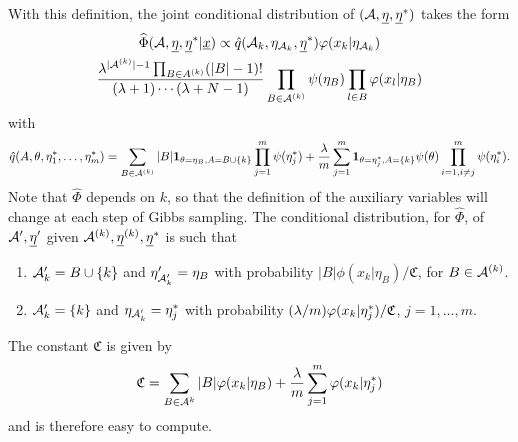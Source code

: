 \begin{enumerate}[label=(\arabic*), wide=0.5cm]
With this definition, the joint conditional distribution of $({\mathcal A}, {\underline{\eta}}, {\underline{\eta}}^*)$ takes the form
\begin{multline}
\label{eq:dp.gs.2}
\widehat \Phi({\mathcal A}, {\underline{\eta}}, {\underline{\eta}}^*|{\underline{x}}) \propto \hat q({\mathcal A}_k, \eta_{{\mathcal A}_k}, {\underline{\eta}}^*) \varphi(x_k|\eta_{{\mathcal A}_k})
\\\frac{\lambda^{|{\mathcal A}^{(k)}|-1} \prod_{B \in A^{(k)}} (|B|-1)!}{(\lambda+1) \cdots (\lambda+N-1)} \prod_{B \in {\mathcal A}^{(k)}} \psi(\eta_B) \prod_{l \in B}  \varphi(x_l|\eta_B)
\end{multline}
with
\[
\hat q (A, \theta, \eta^*_1, \ldots, \eta_m^*) = \sum_{B\in {\mathcal A}^{(k)}} |B| {\bm 1}_{\theta = \eta_B, A = B\cup \{k\}} \prod_{j=1}^m \psi(\eta^*_j) + \frac{\lambda}{m} \sum_{j=1}^m{\bm 1}_{\theta = \eta^*_j, A = \{k\}} \psi(\theta) \prod_{i=1, i\neq j}^m \psi(\eta^*_i).
\]
Note that $\widehat\Phi$ depends on $k$, so that the definition of the auxiliary variables will change at each step of Gibbs sampling.
The conditional distribution, for $\widehat\Phi$, of ${\mathcal A}', {\underline{\eta}}'$ given ${\mathcal A}^{(k)}, {\underline{\eta}}^{(k)}, {\underline{\eta}}^*$
is such that
\begin{enumerate}[label = $\bullet$, wide=0.5cm]
\item ${\mathcal A}'_k=B \cup\{k\}$ and $\eta'_{{\mathcal A}'_k} = \eta_B$ with probability $|B| \phi(x_k|\eta_B)/\mathfrak C$, for $B\in {\mathcal A}^{(k)}$.
\item ${\mathcal A}'_k = \{k\}$ and $\eta_{{\mathcal A}'_k} = \eta^*_j$ with probability $(\lambda/m) \varphi(x_k|\eta^*_j)/\mathfrak C$, $j=1, \ldots, m$.
\end{enumerate}
The constant $\mathfrak C$ is given by
\[
\mathfrak C = \sum_{B \in {\mathcal A}^{k}} |B| \varphi(x_k|\eta_B) + \frac{\lambda}m  \sum_{j=1}^m \varphi(x_k|\eta^*_j)
\]
and is therefore easy to compute.
\end{enumerate}

